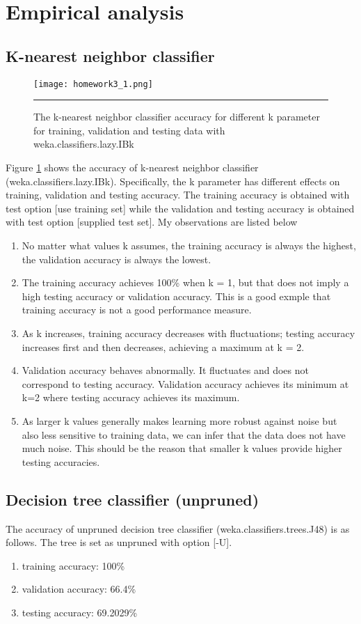 \documentclass[12pt]{article}
\begin{document}
\section{Empirical analysis}
\subsection{K-nearest neighbor classifier}
\begin{figure}[htb]
  \centering
      {\texttt{[image: homework3\_1.png]}} \rule{1\linewidth}{1pt}
      \caption{The k-nearest neighbor classifier accuracy for different k parameter for training, validation and testing data with weka.classifiers.lazy.IBk}
      \label{fig:accuracy}
\end{figure}
Figure \ref{fig:accuracy} shows the accuracy of k-nearest neighbor classifier (weka.classifiers.lazy.IBk). Specifically, the k parameter has different effects on training, validation and testing accuracy. The training accuracy is obtained with test option [use training set] while the validation and testing accuracy is obtained with test option [supplied test set]. My observations are listed below
\begin{enumerate}
\item No matter what values k assumes, the training accuracy is always the highest, the validation accuracy is always the lowest.
\item The training accuracy achieves 100\% when k = 1, but that does not imply a high testing accuracy or validation accuracy. This is a good exmple that training accuracy is not a good performance measure.
\item As k increases, training accuracy decreases with fluctuations; testing accuracy increases first and then decreases, achieving a maximum at k = 2.
\item Validation accuracy behaves abnormally. It fluctuates and does not correspond to testing accuracy. Validation accuracy achieves its minimum at k=2 where testing accuracy achieves its maximum.
\item As larger k values generally makes learning more robust against noise but also less sensitive to training data, we can infer that the data does not have much noise. This should be the reason that smaller k values provide higher testing accuracies.
\end{enumerate}
\subsection{Decision tree classifier (unpruned)}
The accuracy of unpruned decision tree classifier (weka.classifiers.trees.J48) is as follows. The tree is set as unpruned with option [-U].
\begin{enumerate}
\item training accuracy: 100\%
\item validation accuracy: 66.4\%
\item testing accuracy: 69.2029\%
\end{enumerate}
\end{document}
